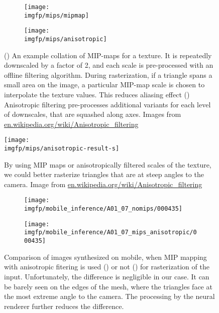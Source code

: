 \begin{figure}
	\centering
	\begin{subfigure}[b]{0.48\textwidth}
		\centering
		\texttt{[image: \\imgfp/mips/mipmap]}%
		\caption{}
		\label{fig:mipmap}
	\end{subfigure}
	\hfill
	\begin{subfigure}[b]{0.48\textwidth}
		\centering
		\texttt{[image: \\imgfp/mips/anisotropic]}
		\caption{}
		\label{fig:anisotropic}
	\end{subfigure}
	\caption{(\protect{}) An example collation of MIP-maps for a texture. It is repeatedly downscaled by a factor of 2, and each scale is pre-processed with an offline filtering algorithm. During rasterization, if a triangle spans a small area on the image, a particular MIP-map scale is chosen to interpolate the texture values. This reduces aliasing effect (\protect{}) Anisotropic filtering pre-processes additional variants for each level of downscales, that are squashed along axes. Images from \href{https://en.wikipedia.org/wiki/Anisotropic_filtering}{en.wikipedia.org/wiki/Anisotropic\_filtering}} 
\end{figure}
\begin{figure}
	\centering
	\texttt{[image: \\imgfp/mips/anisotropic-result-s]}
	\caption{By using MIP maps or anisotropically filtered scales of the texture, we could better rasterize triangles that are at steep angles to the camera. Image from \href{https://en.wikipedia.org/wiki/Anisotropic_filtering}{en.wikipedia.org/wiki/Anisotropic\_filtering}}
	\label{fig:anisotropic_result}
\end{figure}
\begin{figure}
	\centering
	\begin{subfigure}[b]{0.49\textwidth}
		\centering
		\texttt{[image: \\imgfp/mobile\_inference/A01\_07\_nomips/000435]}%
		\caption{}
		\label{fig:no_mipmap_inference}
	\end{subfigure}
	\hfill
	\begin{subfigure}[b]{0.49\textwidth}
		\centering
		\texttt{[image: \\imgfp/mobile\_inference/A01\_07\_mips\_anisotropic/000435]}
		\caption{}
		\label{fig:anisotropic_inference}
	\end{subfigure}
	\caption{Comparison of images synthesized on mobile, when MIP mapping with anisotropic fitering is used (\protect{}) or not (\protect{}) for rasterization of the input. Unfortunately, the difference is negligible in our case. It can be barely seen on the edges of the mesh, where the triangles face at the most extreme angle to the camera. The processing by the neural renderer further reduces the difference.}
\end{figure}
